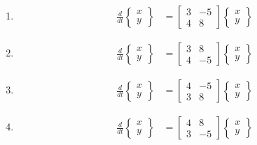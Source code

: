 \documentclass[journal]{IEEEtran}
\numberwithin{equation}{enumi}
\numberwithin{figure}{enumi}
\begin{document}
\begin{enumerate}
    \begin{multicols}{4}
    \begin{enumerate}
    \item 
    \begin{align*}
\frac{d}{dt}
\begin{Bmatrix}
x \\
y
\end{Bmatrix}
&=
\begin{bmatrix}
3 & -5 \\
4 & 8
\end{bmatrix}
\begin{Bmatrix}
x \\
y
\end{Bmatrix}
\end{align*}
\item \begin{align*}
\frac{d}{dt}
\begin{Bmatrix}
x \\
y
\end{Bmatrix}
&=
\begin{bmatrix}
3 & 8 \\
4 & -5
\end{bmatrix}
\begin{Bmatrix}
x \\
y
\end{Bmatrix}
\end{align*}
    \item \begin{align*}
\frac{d}{dt}
\begin{Bmatrix}
x \\
y
\end{Bmatrix}
&=
\begin{bmatrix}
4 & -5 \\
3 & 8
\end{bmatrix}
\begin{Bmatrix}
x \\
y
\end{Bmatrix}
\end{align*}

\item \begin{align*}
\frac{d}{dt}
\begin{Bmatrix}
x \\
y
\end{Bmatrix}
&=
\begin{bmatrix}
4 & 8 \\
3 & -5
\end{bmatrix}
\begin{Bmatrix}
x \\
y
\end{Bmatrix}
\end{align*}
\end{enumerate}
\end{multicols}


\end{enumerate}
\end{document}
